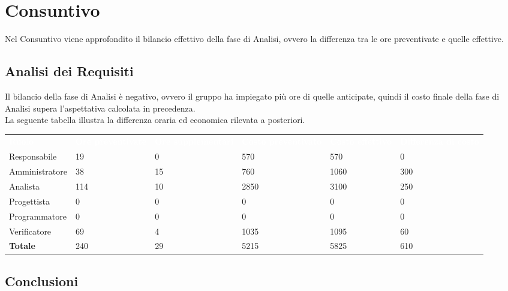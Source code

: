 \section{Consuntivo}


Nel Consuntivo viene approfondito il bilancio effettivo della fase di Analisi, ovvero la differenza tra le ore preventivate e quelle effettive.


\subsection{Analisi dei Requisiti}

Il bilancio della fase di Analisi è negativo, ovvero il gruppo ha impiegato più ore di quelle anticipate, quindi il costo finale della fase di Analisi supera l'aspettativa calcolata in precedenza.\\

La seguente tabella illustra la differenza oraria ed economica rilevata a posteriori.

\renewcommand{\arraystretch}{2}
\begin{table}[h]
\centering
\caption{Tabella del costo complessivo per ruolo}
\begin{longtable}{ C{2.5cm} C{2.5cm} C{2.5cm} C{2.5cm} C{2.5cm} C{2.5cm}}
	\textcolor{white}{\textbf{Ruolo}} & 
	\textcolor{white}{\textbf{Ore preventivate}} & 
	\textcolor{white}{\textbf{Ore supplementari}} & 
	\textcolor{white}{\textbf{Costo preventivato}} & 
	\textcolor{white}{\textbf{Costo effettivo}} & 
	\textcolor{white}{\textbf{Differenza di costo}}\\	
	
	Responsabile & 19 & 0 & 570 & 570 & 0 \\
	Amministratore & 38 & 15 & 760 & 1060 & 300 \\
	Analista & 114 & 10 & 2850 & 3100 & 250 \\
	Progettista & 0 & 0 & 0 & 0 & 0 \\
	Programmatore & 0 & 0 & 0 & 0 & 0 \\
	Verificatore & 69 & 4 & 1035 & 1095 & 60 \\
	\textbf{Totale} & 240 & 29 & 5215 & 5825 & 610 \\	
	
\end{longtable}
\end{table}

\subsection{Conclusioni}

